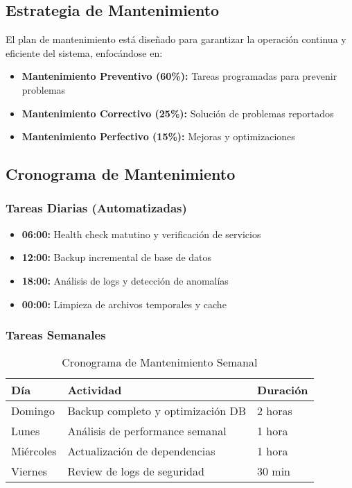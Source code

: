 \documentclass[12pt,a4paper]{article}
\begin{document}
\subsection{Estrategia de Mantenimiento}

El plan de mantenimiento está diseñado para garantizar la operación continua y eficiente del sistema, enfocándose en:

\begin{itemize}
    \item \textbf{Mantenimiento Preventivo (60\%):} Tareas programadas para prevenir problemas
    \item \textbf{Mantenimiento Correctivo (25\%):} Solución de problemas reportados
    \item \textbf{Mantenimiento Perfectivo (15\%):} Mejoras y optimizaciones
\end{itemize}

\subsection{Cronograma de Mantenimiento}

\subsubsection{Tareas Diarias (Automatizadas)}

\begin{itemize}
    \item \textbf{06:00:} Health check matutino y verificación de servicios
    \item \textbf{12:00:} Backup incremental de base de datos
    \item \textbf{18:00:} Análisis de logs y detección de anomalías
    \item \textbf{00:00:} Limpieza de archivos temporales y cache
\end{itemize}

\subsubsection{Tareas Semanales}

\begin{table}[h]
\centering
\begin{tabularx}{\textwidth}{|l|X|l|}
\hline
\textbf{Día} & \textbf{Actividad} & \textbf{Duración} \\
\hline
Domingo & Backup completo y optimización DB & 2 horas \\
\hline
Lunes & Análisis de performance semanal & 1 hora \\
\hline
Miércoles & Actualización de dependencias & 1 hora \\
\hline
Viernes & Review de logs de seguridad & 30 min \\
\hline
\end{tabularx}
\caption{Cronograma de Mantenimiento Semanal}
\end{table}
\end{document}
